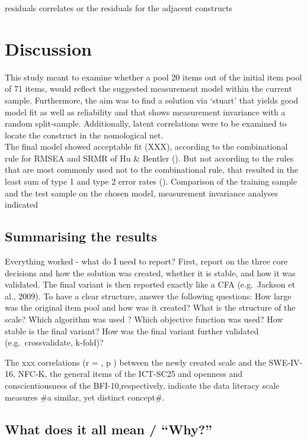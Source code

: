 \documentclass[
  12pt,
  a4paper,
  twoside]{article}
\begin{document}
residuals
correlates or the residuals for the adjacent constructs

\section{Discussion}\label{discussion}

This study meant to examine whether a pool 20 items out of the initial item pool of 71 items, would reflect the suggested measurement model within the current sample. Furthermore, the aim was to find a solution via `stuart' that yields good model fit as well as reliability and that shows measurement invariance with a random split-sample. Additionally, latent correlations were to be examined to locate the construct in the nomological net.\\
The final model showed acceptable fit (XXX), according to the combinational rule for RMSEA and SRMR of Hu \& Bentler (). But not according to the rules that are most commonly used not to the combinational rule, that resulted in the least sum of type 1 and type 2 error rates ().
Comparison of the training sample and the test sample on the chosen model, measurement invariance analyses indicated

\subsection{Summarising the results}\label{summarising-the-results}

Everything worked - what do I need to report?
First, report on the three core decisions and how the solution was created, whether it is stable, and how it was validated. The final variant is then reported exactly like a CFA (e.g.~Jackson et al., 2009). To have a clear structure, answer the following questions:
How large was the original item pool and how was it created?
What is the structure of the scale?
Which algorithm was used ?
Which objective function was used?
How stable is the final variant?
How was the final variant further validated (e.g.~crossvalidate, k-fold)?

The xxx correlations (r = , p ) between the newly created scale and the SWE-IV-16, NFC-K, the general items of the ICT-SC25 and openness and conscientiousness of the BFI-10,respectively, indicate the data literacy scale measures \#a similar, yet distinct concept\#.

\subsection{What does it all mean / ``Why?''}\label{what-does-it-all-mean-why}
\end{document}
